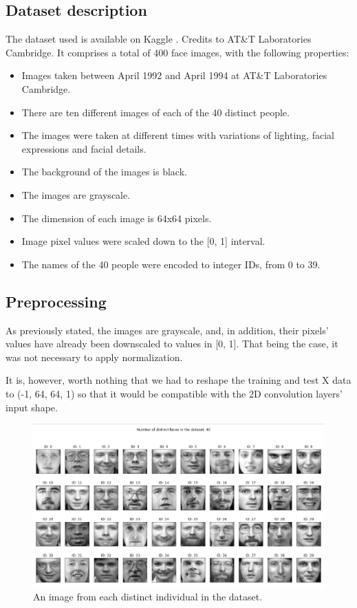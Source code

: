 \documentclass[conference]{IEEEtran}
\begin{document}
\subsection{Dataset description}

The dataset used is available on Kaggle \cite{olivetti_dataset}. Credits to AT\&T Laboratories Cambridge\cite{att_labs_cambridge}.
It comprises a total of 400 face images, with the following properties:
\begin{itemize}
\item Images taken between April 1992 and April 1994 at AT\&T Laboratories Cambridge.
\item There are ten different images of each of the 40 distinct people.
\item The images were taken at different times with variations of lighting, facial expressions and facial details.
\item The background of the images is black.
\item The images are grayscale.
\item The dimension of each image is 64x64 pixels.
\item Image pixel values were scaled down to the [0, 1] interval.
\item The names of the 40 people were encoded to integer IDs, from 0 to 39.
\end{itemize}

\subsection{Preprocessing}

As previously stated, the images are grayscale, and, in addition, their pixels' values have already been downscaled to values in [0, 1]. That being the case, it was not necessary to apply normalization.

It is, however, worth nothing that we had to reshape the training and test X data to (-1, 64, 64, 1) so that it would be compatible with the 2D convolution layers' input shape.

\begin{figure}[]
    \centering
    \includegraphics[scale=0.4]{images/0_distinct_faces.png}
    \caption{An image from each distinct individual in the dataset.}
    \label{fig:distinct_faces}
\end{figure}
\end{document}
